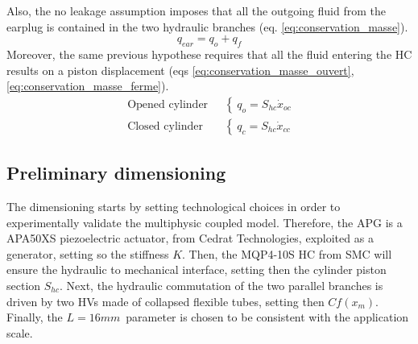 \documentclass[3p,twocolumn,preprint]{elsarticle}
\begin{document}
Also, the no leakage assumption imposes that all the outgoing fluid from the earplug is contained in the two hydraulic branches (eq. \ref{eq:conservation_masse}).
\begin{equation}
	q_{ear} = q_o + q_f
	\label{eq:conservation_masse}
\end{equation}
Moreover, the same previous hypothese requires that all the fluid entering the HC results on a piston displacement (eqs \ref{eq:conservation_masse_ouvert},\ref{eq:conservation_masse_ferme}).
\begin{align}
	\text{Opened cylinder ~}& \left\{~
	q_o = S_{hc} \dot{x}_{oc}
	\right.
	\label{eq:conservation_masse_ouvert}\\
	\text{Closed cylinder ~}& \left\{~
	q_c = S_{hc} \dot{x}_{cc}
	\right.
	\label{eq:conservation_masse_ferme}
\end{align}

	\subsection{Preliminary dimensioning}	
	\label{subsec:Preliminar dimensionning}
The dimensioning starts by setting technological choices in order to experimentally validate the multiphysic coupled model. Therefore, the APG is a APA50XS piezoelectric actuator, from Cedrat Technologies, exploited as a generator, setting so the stiffness $K$. Then, the MQP4-10S HC from SMC will ensure the hydraulic to mechanical interface, setting then the cylinder piston section $S_{hc}$. Next, the hydraulic commutation of the two parallel branches is driven by two HVs made of collapsed flexible tubes, setting then $Cf(x_m)$. Finally, the \mbox{$L=16mm$ }parameter is chosen to be consistent with the application scale. 
\end{document}
